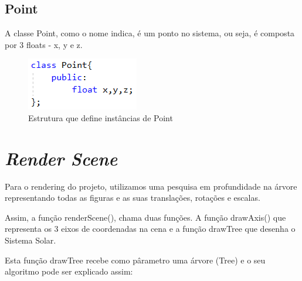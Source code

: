 \documentclass[a4paper]{article}
\begin{document}
\subsection{Point}
\label{sec:point}

A classe Point, como o nome indica, é um ponto no sistema, ou seja, é composta por 3 floats - x, y e z.

\begin{figure}[H]
\centering
\includegraphics[scale=0.8]{point.png}
\caption{Estrutura que define instâncias de Point}
\label{img:Point}
\end{figure}


\newpage

\section{\textit{Render Scene}}
Para o rendering do projeto, utilizamos uma pesquisa em profundidade na árvore representando  todas as figuras e as suas translações, rotações e escalas.

Assim, a função renderScene(), chama duas funções. A função drawAxis() que representa os 3 eixos de coordenadas na cena e a função drawTree que desenha o Sistema Solar. 

Esta função drawTree recebe como pârametro uma árvore (Tree) e o seu algoritmo pode ser explicado assim:
\end{document}
